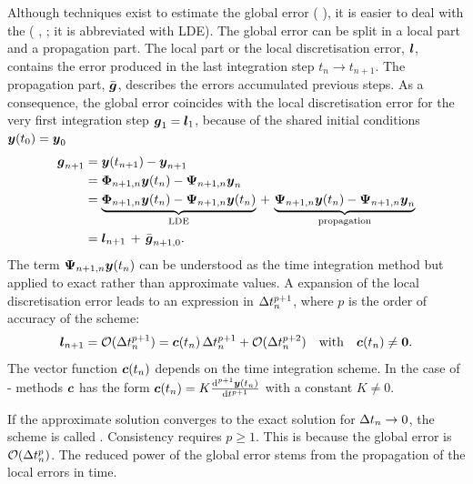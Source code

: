 Although techniques exist to estimate the global
error ( \etal{} \cite{strdyn:hairer87, strdyn:hairer91}), it is easier to deal
with 
the  (\cf{}  \etal{}
\cite{strdyn:hairer87},  \etal{} \cite{strdyn:deuflhard94}; it is
abbreviated with LDE)\@.  
The global error can be split in a local part and a propagation
part. The local part or the local discretisation error, $\boldsymbol{l}$, 
contains the 
error produced in the last integration step $t_n \to t_{n+1}$\@. The
propagation part, $\bar{\boldsymbol{g}}$, describes the errors accumulated
previous steps. As a consequence, the global error coincides with the
local discretisation error for the very first integration step
$\boldsymbol{g}_1 = \boldsymbol{l}_1$, because of the shared initial conditions
$\boldsymbol{y}(t_0) = \boldsymbol{y}_0$
\begin{equation}\label{strdyn:eq:adap:ge-lde-prop}
\begin{split}
  \boldsymbol{g}_{n+1}
  & = \boldsymbol{y}(t_{n+1}) - \boldsymbol{y}_{n+1}
\\
  & = \boldsymbol{\Phi}_{n+1,n} \boldsymbol{y}(t_n) - \boldsymbol{\Psi}_{n+1,n} \boldsymbol{y}_n
\\
  & = \underbrace{\boldsymbol{\Phi}_{n+1,n} \boldsymbol{y}(t_n) -
  \boldsymbol{\Psi}_{n+1,n} \boldsymbol{y}(t_n)}_{\text{LDE}}
  \,+\, \underbrace{\boldsymbol{\Psi}_{n+1,n} \boldsymbol{y}(t_n) -
  \boldsymbol{\Psi}_{n+1,n} \boldsymbol{y}_n}_{\text{propagation}}
\\
  & = \boldsymbol{l}_{n+1} \,+\, \bar{\boldsymbol{g}}_{n+1,0}
  \text{.}
\end{split}
\end{equation}
The term $\boldsymbol{\Psi}_{n+1,n} \boldsymbol{y}(t_n)$ can be understood as the
time integration method but applied to exact rather than
approximate values. A  expansion of the local discretisation error leads to an
expression 
in $\Delta t_n^{p+1}$, where $p$ is the order of accuracy of the scheme:
\begin{equation} \label{strdyn:eq:lde}
  \boldsymbol{l}_{n+1} 
  = \mathcal{O}(\Delta t_n^{p+1})
  = \boldsymbol{c}(t_n)\, \Delta t_n^{p+1} + \mathcal{O}(\Delta t_n^{p+2})
  \quad\text{with}\quad
  \boldsymbol{c}(t_n) \neq \boldsymbol{0}
  \text{.}
\end{equation}
The vector function $\boldsymbol{c}(t_n)$ depends on the time
integration scheme. In the case of - methods $\boldsymbol{c}$ has
the form $\boldsymbol{c}(t_n) = K \frac{\mathrm{d}^{p+1} \boldsymbol{y}(t_n)}{\mathrm{d}
  t^{p+1}}$ with a constant $K \neq 0$\@.

If the approximate solution converges
to the exact solution for $\Delta t_n\to0$, the scheme is called
\@. Consistency requires $p\geq1$\@. This is because the
global error is $\mathcal{O}(\Delta t_n^p)$\@. The reduced 
power of the global error stems from the propagation of the local
errors in time. 

